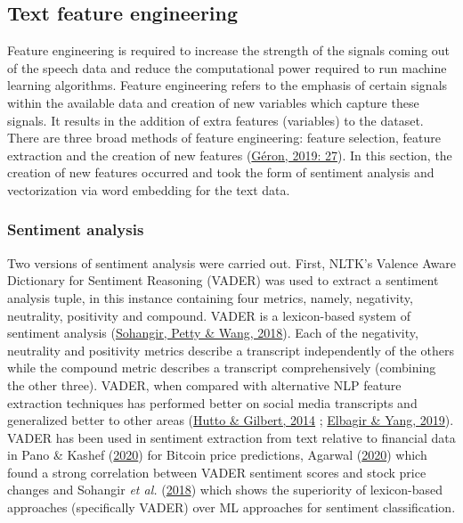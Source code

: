 \documentclass[11pt,preprint, authoryear]{elsarticle}
\numberwithin{equation}{section}
\numberwithin{figure}{section}
\numberwithin{table}{section}
\begin{document}
\hypertarget{text-feature-engineering}{%
\subsection{Text feature engineering}\label{text-feature-engineering}}

Feature engineering is required to increase the strength of the signals
coming out of the speech data and reduce the computational power
required to run machine learning algorithms. Feature engineering refers
to the emphasis of certain signals within the available data and
creation of new variables which capture these signals. It results in the
addition of extra features (variables) to the dataset. There are three
broad methods of feature engineering: feature selection, feature
extraction and the creation of new features
(\protect\hyperlink{ref-geron2019hands}{Géron, 2019: 27}). In this
section, the creation of new features occurred and took the form of
sentiment analysis and vectorization via word embedding for the text
data.

\hypertarget{sentiment-analysis}{%
\subsubsection{Sentiment analysis}\label{sentiment-analysis}}

Two versions of sentiment analysis were carried out. First, NLTK's
Valence Aware Dictionary for Sentiment Reasoning (VADER) was used to
extract a sentiment analysis tuple, in this instance containing four
metrics, namely, negativity, neutrality, positivity and compound. VADER
is a lexicon-based system of sentiment analysis
(\protect\hyperlink{ref-sohangir2018financial}{Sohangir, Petty \& Wang,
2018}). Each of the negativity, neutrality and positivity metrics
describe a transcript independently of the others while the compound
metric describes a transcript comprehensively (combining the other
three). VADER, when compared with alternative NLP feature extraction
techniques has performed better on social media transcripts and
generalized better to other areas
(\protect\hyperlink{ref-hutto2014vader}{Hutto \& Gilbert, 2014} ;
\protect\hyperlink{ref-elbagir2019twitter}{Elbagir \& Yang, 2019}).
VADER has been used in sentiment extraction from text relative to
financial data in Pano \& Kashef
(\protect\hyperlink{ref-pano2020complete}{2020}) for Bitcoin price
predictions, Agarwal
(\protect\hyperlink{ref-agarwal2020sentiment}{2020}) which found a
strong correlation between VADER sentiment scores and stock price
changes and Sohangir \emph{et al.}
(\protect\hyperlink{ref-sohangir2018financial}{2018}) which shows the
superiority of lexicon-based approaches (specifically VADER) over ML
approaches for sentiment classification.
\end{document}
